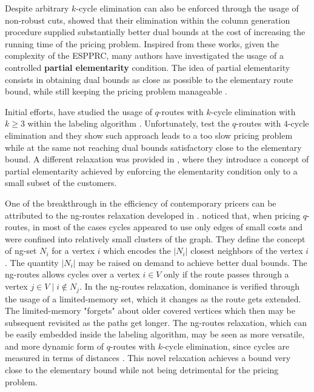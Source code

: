 \medskip

Despite arbitrary $k$-cycle elimination can also
be enforced through the usage of non-robust cuts,
\citeauthor{feillet2004} showed that their elimination
within the column generation procedure supplied
substantially better dual bounds at the cost
of increasing the running time of the pricing problem.
Inspired from these works, given the complexity
of the ESPPRC, many authors have investigated the usage
of a controlled \textbf{partial elementarity} condition.
The idea of partial elementarity consists in obtaining
dual bounds as close as possible to the elementary route bound,
while still keeping the pricing problem manageable \parencite{contardo2015}.

Initial efforts, have studied the usage of $q$-routes with
$k$-cycle elimination with $k \ge 3$ within the labeling algorithm \parencite{irnich2006, fukasawa2006}.
Unfortunately, \textcite{fukasawa2006}
test the $q$-routes with $4$-cycle elimination
and they show such approach leads
to a too slow pricing problem
while at the same not reaching dual bounds
satisfactory close to the elementary bound.
A different relaxation was provided in \textcite{desaulniers2008},
where they introduce a concept of partial elementarity achieved
by enforcing the elementarity condition only to a small subset of the customers.

One of the breakthrough in the efficiency of contemporary pricers
can be attributed to the ng-routes relaxation developed in \textcite{baldacci2011}.
\citeauthor{baldacci2011} noticed that, when pricing $q$-routes,
in most of the cases cycles appeared to use only edges of small costs
and were confined into relatively small clusters of the graph.
They define the concept of ng-set $N_i$ for a vertex $i$
which encodes the $|N_i|$ closest neighbors of the vertex $i$.
The quantity $|N_i|$ may be raised on demand to achieve better dual bounds.
The ng-routes allows cycles over a vertex $i \in V$ only if the route
passes through a vertex $j \in V \mid i \notin N_j$.
In the ng-routes relaxation,
dominance is verified through the usage of a limited-memory set,
which it changes as the route gets extended.
The limited-memory "forgets" about older covered vertices
which then may be subsequent revisited as the paths get longer.
The ng-routes relaxation, which can be easily embedded inside the labeling algorithm,
may be seen as more versatile, and more dynamic form of $q$-routes
with $k$-cycle elimination, since cycles are measured in terms of distances \parencite{contardo2014}.
This novel relaxation achieves a bound very close to the elementary bound while
not being detrimental for the pricing problem.

